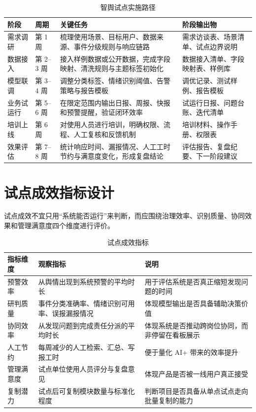 \begin{table}[htbp]
	\centering
	\caption{智舆试点实施路径}
	\begin{tabularx}{\textwidth}{L{2cm}L{2.1cm}Y L{3cm}}
		\toprule
		阶段    & 周期       & 关键任务                            & 阶段输出物             \\
		\midrule
		需求调研  & 第 1 周    & 梳理使用场景、目标用户、数据来源、事件分级规则与响应链路    & 需求访谈表、场景清单、试点边界说明 \\
		数据接入  & 第 2--3 周 & 接入样例数据或公开数据，完成字段映射、清洗规则与主题标签初始化 & 数据接入清单、字段映射表、样例库  \\
		模型联调  & 第 3--4 周 & 调整分类标签、情绪识别阈值、告警策略与报告模板         & 调优记录、测试样例、报告模板    \\
		业务试运行 & 第 5--6 周 & 在限定范围内输出日报、周报、快报和预警提醒，验证闭环效率    & 试运行日报、问题台账、迭代清单   \\
		培训上线  & 第 6 周    & 对使用人员进行培训，明确权限、流程、人工复核和反馈机制     & 培训材料、操作手册、权限表     \\
		效果评估  & 第 7--8 周 & 统计响应时间、漏报情况、人工工时节约与满意度变化，形成复盘结论 & 评估报告、复盘纪要、下一阶段建议  \\
		\bottomrule
	\end{tabularx}
\end{table}

\section{试点成效指标设计}

试点成效不宜只用“系统能否运行”来判断，而应围绕治理效率、识别质量、协同效果和管理满意度四个维度进行评价。

\begin{table}[htbp]
	\centering
	\caption{试点成效指标}
	\begin{tabularx}{\textwidth}{L{3cm}L{3cm}Y}
		\toprule
		指标维度  & 观察指标                   & 说明                      \\
		\midrule
		预警效率  & 从舆情出现到系统预警的平均时长        & 用于评估系统是否真正缩短发现问题的时间     \\
		研判质量  & 事件分类准确率、情绪识别可用率、误报漏报情况 & 体现模型输出是否具备辅助决策价值        \\
		协同效率  & 从发现问题到完成责任分派的平均时长      & 体现系统是否推动跨岗位协同，而非停留在看板展示 \\
		人工节约  & 每周减少的人工检索、汇总、写报工时      & 便于量化 AI+ 带来的效率提升        \\
		管理满意度 & 试点单位使用人员评分与复盘意见        & 体现产品是否被一线用户真正接受         \\
		复制潜力  & 试点后可复制模块数量与标准化程度       & 判断项目是否具备从单点试点走向批量复制的能力  \\
		\bottomrule
	\end{tabularx}
\end{table}

